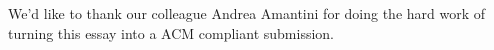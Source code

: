 \documentclass[sigconf,screen,pbalance=true]{acmart}
\begin{document}

\begin{acks}
We’d like to thank our colleague Andrea Amantini for doing the hard work of turning this essay into a ACM compliant submission.
\end{acks}
%
%
%
\end{document}
